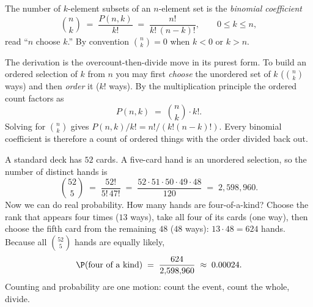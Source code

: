 \begin{definition}
\label{ch2:def-binom}
The number of $k$-element subsets of an $n$-element set is the \emph{binomial coefficient}
\[
  \binom{n}{k} \;=\; \frac{P(n,k)}{k!} \;=\; \frac{n!}{k!\,(n-k)!}, \qquad 0 \le k \le n,
\]
read ``$n$ choose $k$.'' By convention $\binom{n}{k} = 0$ when $k < 0$ or $k > n$.
\end{definition}

\begin{whybox}
The derivation is the overcount-then-divide move in its purest form. To build an ordered
selection of $k$ from $n$ you may first \emph{choose} the unordered set of $k$ ($\binom{n}{k}$
ways) and then \emph{order} it ($k!$ ways). By the multiplication principle the ordered count
factors as
\[
  P(n,k) \;=\; \binom{n}{k}\cdot k!.
\]
Solving for $\binom{n}{k}$ gives $P(n,k)/k! = n!/(k!(n-k)!)$. Every binomial coefficient is
therefore a count of ordered things with the order divided back out.
\end{whybox}

\begin{example}
\label{ch2:ex-poker}
A standard deck has $52$ cards. A five-card hand is an unordered selection, so the number of
distinct hands is
\[
  \binom{52}{5} \;=\; \frac{52!}{5!\,47!} \;=\; \frac{52\cdot 51\cdot 50\cdot 49\cdot 48}
  {120} \;=\; 2{,}598{,}960.
\]
Now we can do real probability. How many hands are four-of-a-kind? Choose the rank that
appears four times ($13$ ways), take all four of its cards (one way), then choose the fifth
card from the remaining $48$ ($48$ ways): $13 \cdot 48 = 624$ hands. Because all
$\binom{52}{5}$ hands are equally likely,
\[
  \P(\text{four of a kind}) \;=\; \frac{624}{2{,}598{,}960} \;\approx\; 0.00024.
\]
Counting and probability are one motion: count the event, count the whole, divide.
\end{example}

